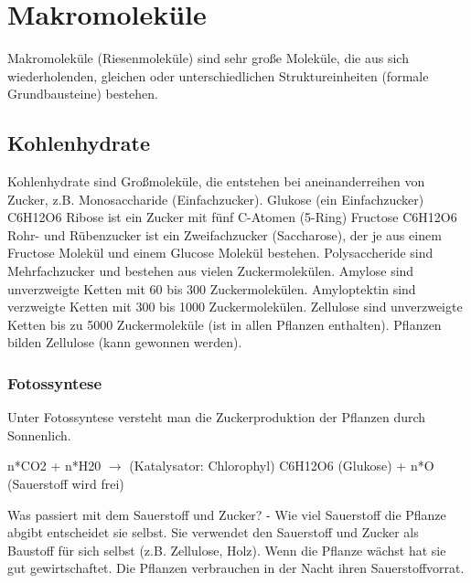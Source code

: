 \documentclass[a4paper]{article}
\begin{document}
\newpage

\section{Makromoleküle}

Makromoleküle (Riesenmoleküle) sind sehr große Moleküle, die aus sich wiederholenden, gleichen oder unterschiedlichen Struktureinheiten (formale Grundbausteine) bestehen.

\subsection{Kohlenhydrate}

Kohlenhydrate sind Großmoleküle, die entstehen bei aneinanderreihen von Zucker, z.B. Monosaccharide (Einfachzucker).
\newline
\newline
Glukose (ein Einfachzucker) C6H12O6
Ribose ist ein Zucker mit fünf C-Atomen (5-Ring)
Fructose C6H12O6
\newline
\newline
Rohr- und Rübenzucker ist ein Zweifachzucker (Saccharose), der je aus einem Fructose Molekül und einem Glucose  Molekül bestehen.
\newline
\newline
Polysaccheride sind Mehrfachzucker und bestehen aus vielen Zuckermolekülen.
Amylose sind unverzweigte Ketten mit 60 bis 300 Zuckermolekülen.
Amyloptektin sind verzweigte Ketten mit 300 bis 1000 Zuckermolekülen.
Zellulose sind unverzweigte Ketten bis zu 5000 Zuckermoleküle (ist in allen Pflanzen enthalten). Pflanzen bilden Zellulose (kann gewonnen werden).

\subsubsection{Fotossyntese}

Unter Fotossyntese versteht man die Zuckerproduktion der Pflanzen durch Sonnenlich.

n*CO2 + n*H20  $\rightarrow$ (Katalysator: Chlorophyl) C6H12O6 (Glukose) + n*O (Sauerstoff wird frei)

Was passiert mit dem Sauerstoff und Zucker? - Wie viel Sauerstoff die Pflanze abgibt entscheidet sie selbst. Sie verwendet den Sauerstoff und Zucker als Baustoff für sich selbst (z.B. Zellulose, Holz). Wenn die Pflanze wächst hat sie gut gewirtschaftet. Die Pflanzen verbrauchen in der Nacht ihren Sauerstoffvorrat.
\end{document}
